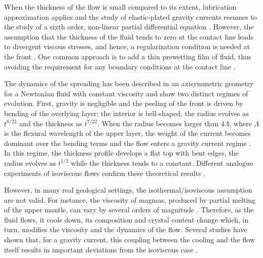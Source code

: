 When  the thickness  of  the flow  is small  compared  to its  extent,
lubrication  approximation applies  and  the  study of  elastic-plated
gravity currents  resumes to  the study of  a sixth  order, non-linear
partial                      differential                     equation
\citep{Michaut:2011kg,Lister:2013ia,Anonymous:QWXp_4JV}   .   However,
the assumption  that the thickness of  the fluid tends to  zero at the
contact  line  leads  to  divergent viscous  stresses,  and  hence,  a
regularization     condition     is     needed    at     the     front
\citep{Flitton:1999iv,Lister:2013ia,Anonymous:QWXp_4JV}.   One  common
approach is to add a thin  prewetting film of fluid, thus avoiding the
requirement  for   any  boundary   conditions  at  the   contact  line
\citep{Lister:2013ia,Anonymous:QWXp_4JV}.

The dynamics  of the spreading  has been described in  an axisymmetric
geometry   for    a   Newtonian   fluid   with    constant   viscosity
\citep{Michaut:2011kg,Lister:2013ia,Thorey:2014cv}   and    show   two
distinct regimes of  evolution.  First, gravity is  negligible and the
peeling of the front is driven  by bending of the overlying layer; the
interior  is bell-shaped,  the radius  evolves as  $t^{8/22}$ and  the
thickness  as  $t^{7/22}$.   When   the  radius  becomes  larger  than
$4\Lambda$, where  $\Lambda$ is the  flexural wavelength of  the upper
layer, the  weight of  the current becomes  dominant over  the bending
terms    and   the    flow   enters    a   gravity    current   regime
\citep{Huppert:1982a}.  In this regime, the thickness profile develops
a flat top with bent edges,  the radius evolves as $t^{1/2}$ while the
thickness  tends to  a  constant.  Different  analogue experiments  of
isoviscous     flows     confirm     these     theoretical     results
\citep{Dixon:1987js,Lister:2013ia}.

However, in  many real geological settings,  the isothermal/isoviscous
assumption  are not  valid.  For  instance, the  viscosity of  magmas,
produced by partial  melting of the upper mantle, can  vary by several
orders    of   magnitude    \citep{Anonymous:CZVBrBvv,Lejeune:1995fc}.
Therefore,  as the  fluid flows,  it cools  down, its  composition and
crystal content change which, in  turn, modifies the viscosity and the
dynamics of the flow.  Several studies  have shown that, for a gravity
current, this coupling between the cooling and the flow itself results
in     important    deviations     from     the    isoviscous     case
\citep{Bercovici:2007vc,Bercovici:1996uu,BALMFORTH:1999ey,Garel:2014era}.

